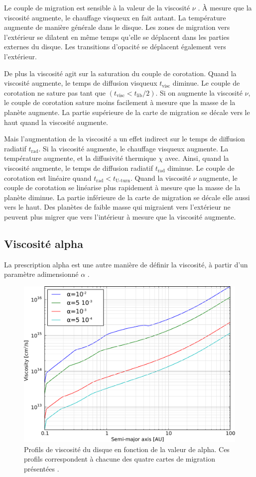 Le couple de migration est sensible à la valeur de la viscosité $\nu$ . À mesure que la
viscosité augmente, le chauffage visqueux en fait autant. La température augmente de manière générale dans le disque. Les
zones de migration vers l'extérieur se dilatent en même temps qu'elle se déplacent dans les parties externes du disque. Les
transitions d'opacité se déplacent également vers l'extérieur. 

De plus la viscosité agit sur la saturation du couple de corotation.
Quand la viscosité augmente, le temps de diffusion visqueux $t_\text{visc}$ diminue. Le couple de corotation ne sature pas tant
que $(t_\text{visc} < t_\text{lib}/2)$. Si on augmente la viscosité $\nu$, le couple de corotation sature moins facilement à
mesure que la masse de la planète augmente. La partie supérieure de la carte de migration se décale vers le haut quand la
viscosité augmente. 

Mais l'augmentation de la viscosité a un effet indirect sur le temps de diffusion radiatif $t_\text{rad}$. Si la viscosité augmente, le chauffage visqueux augmente. La température augmente, et la diffusivité thermique $\chi$ avec. Ainsi, quand la viscosité augmente, le temps de diffusion radiatif $t_\text{rad}$ diminue. Le couple de corotation est linéaire quand $t_\text{rad} < t_\text{U-turn}$. Quand la viscosité $\nu$ augmente, le couple de corotation se linéarise plus rapidement à mesure que la masse de la planète diminue. La partie inférieure de la carte de migration se décale elle aussi vers le haut. Des planètes de faible masse qui migraient vers l'extérieur ne peuvent plus migrer que vers l'intérieur à mesure que la viscosité augmente. 

\subsection{Viscosité alpha}
La prescription alpha \citep{shakura1973black} est une autre manière de définir la viscosité, à partir d'un paramètre adimensionné $\alpha$ .

\begin{figure}[htbp]
\centering
\includegraphics[width=0.6\linewidth]{figure/migration_map/viscosity/alpha_profiles.pdf}
\caption[Profils de viscosité dans le disque pour différentes valeurs de alpha.]{Profils de viscosité du disque en fonction de
la valeur de alpha. Ces profils correspondent à chacune des quatre cartes de migration
présentées \protect{}. }\label{fig:alpha_profiles}
\end{figure}

